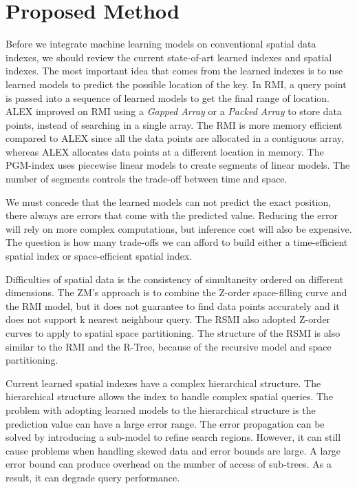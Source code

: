 
\chapter{Proposed Method}

Before we integrate machine learning models on conventional spatial data indexes, we should review the current state-of-art learned indexes and spatial indexes. The most important idea that comes from the learned indexes is to use learned models to predict the possible location of the key. In RMI, a query point is passed into a sequence of learned models to get the final range of location. ALEX improved on RMI using a \textit{Gapped Array} or a \textit{Packed Array} to store data points, instead of searching in a single array. The RMI is more memory efficient compared to ALEX since all the data points are allocated in a contiguous array, whereas ALEX allocates data points at a different location in memory. The PGM-index uses piecewise linear models to create segments of linear models. The number of segments controls the trade-off between time and space. 

We must concede that the learned models can not predict the exact position, there always are errors that come with the predicted value. Reducing the error will rely on more complex computations, but inference cost will also be expensive. The question is how many trade-offs we can afford to build either a time-efficient spatial index or space-efficient spatial index. 

Difficulties of spatial data is the consistency of simultaneity ordered on different dimensions. The ZM’s approach is to combine the Z-order space-filling curve and the RMI model, but it does not guarantee to find data points accurately and it does not support k nearest neighbour query.  The RSMI also adopted Z-order curves to apply to spatial space partitioning. The structure of the RSMI is also similar to the RMI and the R-Tree, because of the recursive model and space partitioning. 

Current learned spatial indexes have a complex hierarchical structure. The hierarchical structure allows the index to handle complex spatial queries. The problem with adopting learned models to the hierarchical structure is the prediction value can have a large error range. The error propagation can be solved by introducing a sub-model to refine search regions. However, it can still cause problems when handling skewed data and error bounds are large. A large error bound can produce overhead on the number of access of sub-trees. As a result, it can degrade query performance. 

